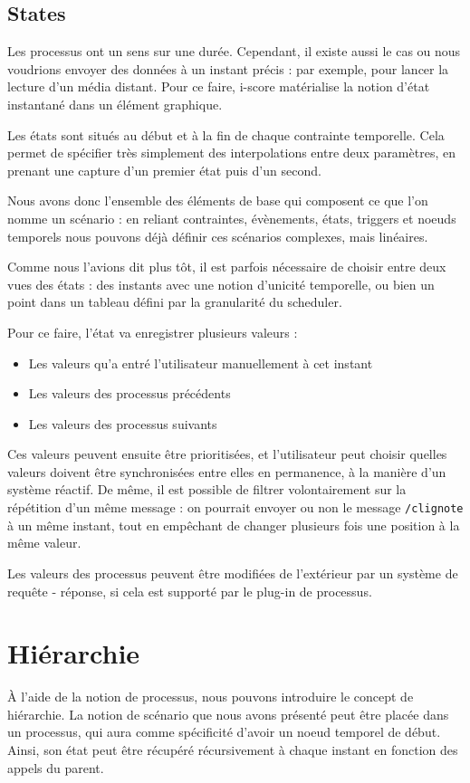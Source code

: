 \documentclass{sigchi}
\begin{document}
\subsection{States}
Les processus ont un sens sur une durée. Cependant, il existe aussi le cas ou nous voudrions envoyer des données à un instant précis : par exemple, pour lancer la lecture d'un média distant.
Pour ce faire, i-score matérialise la notion d'état instantané dans un élément graphique.

Les états sont situés au début et à la fin de chaque contrainte temporelle. Cela permet de spécifier très simplement des interpolations entre deux paramètres, en prenant une capture d'un premier état puis d'un second.

Nous avons donc l'ensemble des éléments de base qui composent ce que l'on nomme un scénario : en reliant contraintes, évènements, états, triggers et noeuds temporels nous pouvons déjà définir ces scénarios complexes, mais linéaires.

Comme nous l'avions dit plus tôt, il est parfois nécessaire de choisir entre deux vues des états : des instants avec une notion d'unicité temporelle, ou bien un point dans un tableau défini par la granularité du scheduler.

Pour ce faire, l'état va enregistrer plusieurs valeurs : 
\begin{itemize}
\item Les valeurs qu'a entré l'utilisateur manuellement à cet instant
\item Les valeurs des processus précédents
\item Les valeurs des processus suivants
\end{itemize}

Ces valeurs peuvent ensuite être prioritisées, et l'utilisateur peut choisir quelles valeurs doivent être synchronisées entre elles en permanence, à la manière d'un système réactif. De même, il est possible de filtrer volontairement sur la répétition d'un même message : on pourrait envoyer ou non le message \verb|/clignote| à un même instant, tout en empêchant de changer plusieurs fois une position à la même valeur. 


Les valeurs des processus peuvent être modifiées de l'extérieur par un système de requête - réponse, si cela est supporté par le plug-in de processus.



\section{Hiérarchie}
À l'aide de la notion de processus, nous pouvons introduire le concept de hiérarchie. La notion de scénario que nous avons présenté peut être placée dans un processus, qui aura comme spécificité d'avoir un noeud temporel de début. Ainsi, son état peut être récupéré récursivement à chaque instant en fonction des appels du parent.
\end{document}
